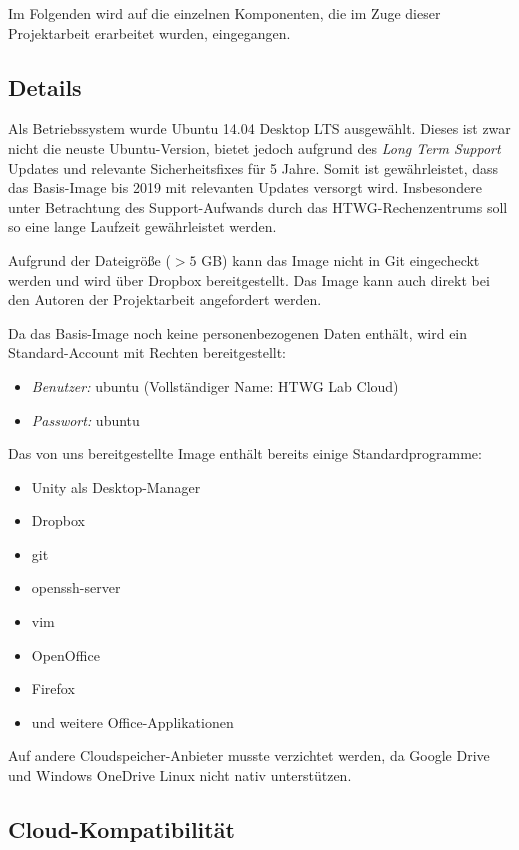 Im Folgenden wird auf die einzelnen Komponenten, die im Zuge dieser Projektarbeit erarbeitet wurden, eingegangen. 

\subsection{Details}

Als Betriebssystem wurde Ubuntu 14.04 Desktop LTS ausgewählt. 
Dieses ist zwar nicht die neuste Ubuntu-Version, bietet jedoch aufgrund des \emph{Long Term Support} Updates und relevante Sicherheitsfixes für 5 Jahre. 
Somit ist gewährleistet, dass das Basis-Image bis 2019 mit relevanten Updates versorgt wird. 
Insbesondere unter Betrachtung des Support-Aufwands durch das HTWG-Rechenzentrums soll so eine lange Laufzeit gewährleistet werden.

Aufgrund der Dateigröße ($> 5$ GB) kann das Image nicht in Git eingecheckt werden und wird über Dropbox \cite{dropboxImage} bereitgestellt. Das Image kann auch direkt bei den Autoren der Projektarbeit angefordert werden.

Da das Basis-Image noch keine personenbezogenen Daten enthält, wird ein Standard-Account mit  Rechten bereitgestellt:

\begin{itemize}
\item \emph{Benutzer:} ubuntu (Vollständiger Name: HTWG Lab Cloud)
\item \emph{Passwort:} ubuntu
\end{itemize}

Das von uns bereitgestellte Image enthält bereits einige Standardprogramme:

\begin{itemize}
\item Unity als Desktop-Manager
\item Dropbox
\item git
\item openssh-server
\item vim
\item OpenOffice
\item Firefox
\item und weitere Office-Applikationen
\end{itemize}

Auf andere Cloudspeicher-Anbieter musste verzichtet werden, da Google Drive und Windows OneDrive Linux nicht nativ unterstützen.

\subsection{Cloud-Kompatibilität}


